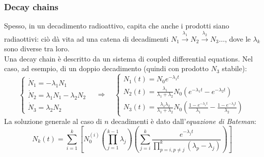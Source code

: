 \subsubsection{Decay chains}

Spesso, in un decadimento radioattivo, capita che anche i prodotti siano radiaottivi: ciò dà vita ad una catena di decadimenti $ N_1 \xrightarrow{\lambda_1} N_2 \xrightarrow{\lambda_2} N_3 \dots $, dove le $ \lambda_k $ sono diverse tra loro.\\
Una decay chain è descritto da un sistema di coupled differential equations. Nel caso, ad esempio, di un doppio decadimento (quindi con prodotto $ N_3 $ stabile):
\begin{equation}
	\begin{cases}
		\dot{N}_1 = - \lambda_1 N_1 \\
		\dot{N}_2 = \lambda_1 N_1 - \lambda_2 N_2 \\
		\dot{N}_3 = \lambda_2 N_2
	\end{cases}
	\quad\Longrightarrow\quad
	\begin{cases}
		N_1(t) = N_0 e^{-\lambda_1 t} \\
		N_2(t) = \frac{\lambda_1}{\lambda_1 + \lambda_2} N_0 \left( e^{-\lambda_1 t} - e^{-\lambda_2 t} \right) \\
		N_3(t) = \frac{\lambda_1 \lambda_2}{\lambda_1 + \lambda_2} N_0 \left( \frac{1 - e^{-\lambda_1 t}}{\lambda_1} - \frac{1 - e^{-\lambda_2 t}}{\lambda_2} \right)
	\end{cases}
	\label{eq:2.5}
\end{equation}
La soluzione generale al caso di $ n $ decadimenti è dato dall'\textit{equazione di Bateman}:
\begin{equation}
	N_k(t) = \sum_{i = 1}^{k} \left[ N_0^{(i)} \left( \prod_{j = 1}^{k-1} \lambda_j \right) \left( \sum_{j = i}^{k} \frac{e^{-\lambda_j t}}{\prod_{p=i, p\neq j}^{k} (\lambda_p - \lambda_j)} \right) \right]
	\label{eq:2.6}
\end{equation}

